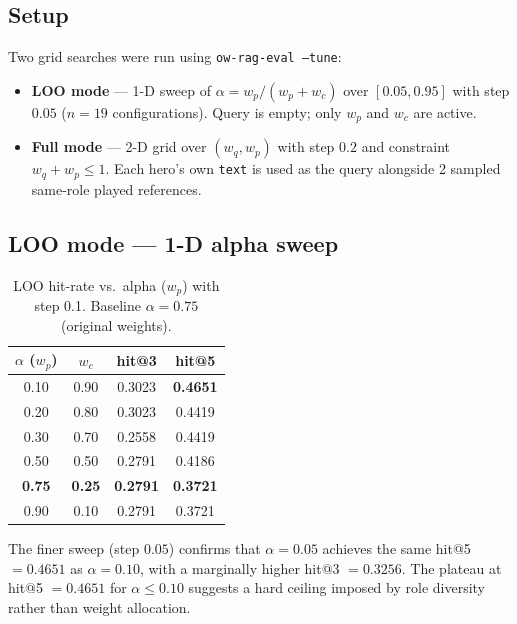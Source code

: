 \documentclass[11pt, a4paper]{article}
\begin{document}
\subsection{Setup}

Two grid searches were run using \texttt{ow-rag-eval --tune}:

\begin{itemize}[leftmargin=1.5em]
  \item \textbf{LOO mode} — 1-D sweep of $\alpha = w_p / (w_p + w_c)$ over
        $[0.05, 0.95]$ with step $0.05$ ($n=19$ configurations).
        Query is empty; only $w_p$ and $w_c$ are active.
  \item \textbf{Full mode} — 2-D grid over $(w_q, w_p)$ with step $0.2$ and
        constraint $w_q + w_p \leq 1$.  Each hero's own \texttt{text} is used
        as the query alongside 2 sampled same-role played references.
\end{itemize}

\subsection{LOO mode — 1-D alpha sweep}

\begin{table}[h]
\centering
\caption{LOO hit-rate vs.\ alpha ($w_p$) with step 0.1. Baseline $\alpha=0.75$ (original weights).}
\begin{tabular}{cccc}
\toprule
$\alpha$ ($w_p$) & $w_c$ & hit@3 & hit@5 \\
\midrule
0.10 & 0.90 & \textcolor{good}{0.3023} & \textcolor{good}{\textbf{0.4651}} \\
0.20 & 0.80 & \textcolor{good}{0.3023} & \textcolor{good}{0.4419} \\
0.30 & 0.70 & 0.2558 & \textcolor{good}{0.4419} \\
0.50 & 0.50 & 0.2791 & \textcolor{mid}{0.4186} \\
\textbf{0.75} & \textbf{0.25} & \textbf{0.2791} & \textcolor{mid}{\textbf{0.3721}} \\
0.90 & 0.10 & 0.2791 & \textcolor{bad}{0.3721} \\
\bottomrule
\end{tabular}
\end{table}

\noindent
The finer sweep (step $0.05$) confirms that $\alpha = 0.05$ achieves the same
hit@5 $= 0.4651$ as $\alpha = 0.10$, with a marginally higher hit@3 $= 0.3256$.
The plateau at hit@5 $= 0.4651$ for $\alpha \leq 0.10$ suggests a hard ceiling
imposed by role diversity rather than weight allocation.
\end{document}
